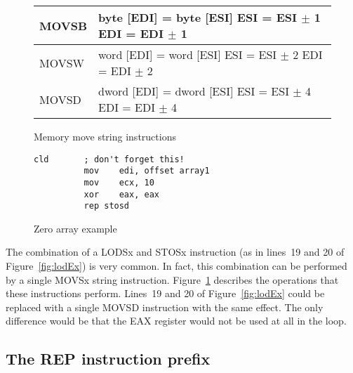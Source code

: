\begin{figure}[t]
\centering
{\code
\begin{tabular}{|lp{2.5in}|}
\hline
MOVSB & byte [EDI] = byte [ESI] \newline ESI = ESI $\pm$ 1 \newline
        EDI = EDI $\pm$ 1 \\
\hline
MOVSW & word [EDI] = word [ESI] \newline ESI = ESI $\pm$ 2 \newline
        EDI = EDI $\pm$ 2 \\
\hline
MOVSD & dword [EDI] = dword [ESI] \newline ESI = ESI $\pm$ 4 \newline
        EDI = EDI $\pm$ 4 \\
\hline
\end{tabular}
}
\caption{Memory move string instructions\label{fig:movString} 
          }
\end{figure}

\begin{figure}[t]
\begin{lstlisting}[language={[x86masm]Assembler},frame=single]
          cld       ; don't forget this!
          mov    edi, offset array1
          mov    ecx, 10
          xor    eax, eax
          rep stosd
\end{lstlisting}
\caption{Zero array example\label{fig:zeroArrayEx}}
\end{figure}

The combination of a {\code LODSx} and {\code STOSx} instruction (as in
lines~19 and 20 of Figure~\ref{fig:lodEx}) is very common. In fact, this
combination can be performed by a single {\code MOVSx} string instruction.
Figure~\ref{fig:movString} describes the operations that these 
instructions perform. Lines~19 and 20 of Figure~\ref{fig:lodEx} could be
replaced with a single {\code MOVSD} instruction with the same effect. The
only difference would be that the EAX register would not be used at all
in the loop. %

\subsection{The {\code REP} instruction prefix}

